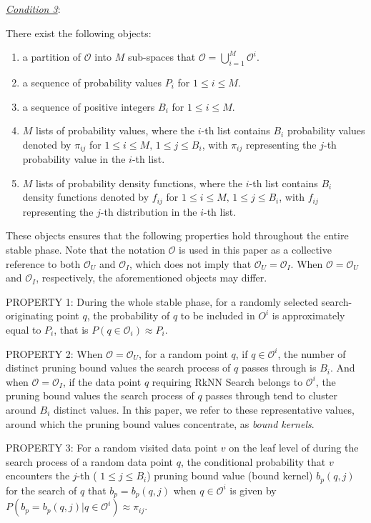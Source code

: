 \noindent \underline{\textit{Condition 3}}:  

There exist the following objects:
\begin{enumerate}
    \item a partition of $\mathcal{O}$ into $M$ sub-spaces that $\mathcal{O} = \bigcup_{i=1}^{M}\mathcal{O}^i$.
    \item  a sequence of probability values $P_i$ for $1 \leq i \leq M$.
    \item  a sequence of positive integers $B_i$ for $1 \leq i \leq M$.
    \item  $M$ lists of probability values, where the $i$-th list contains $B_i$ probability values denoted by $\pi_{ij}$ for $1 \leq i \leq M,\, 1 \leq j \leq B_i$, with $\pi_{ij}$ representing the $j$-th probability value in the $i$-th list.
    \item  $M$ lists of probability density functions, where the $i$-th list contains $B_i$ density functions denoted by $f_{ij}$ for $1 \leq i \leq M,\, 1 \leq j \leq B_i$, with $f_{ij}$ representing the $j$-th distribution in the $i$-th list.
\end{enumerate}
 These objects ensures that the following properties hold throughout the entire stable phase. Note that the notation $\mathcal{O}$ is used in this paper as a collective reference to both $\mathcal{O}_U$ and $\mathcal{O}_I$, which does not imply that $\mathcal{O}_U = \mathcal{O}_I$. When $\mathcal{O} = \mathcal{O}_U$ and $\mathcal{O}_I$, respectively, the aforementioned objects may differ.


\noindent PROPERTY 1: During the whole stable phase, for a randomly selected search-originating point $q$, the probability of $q$ to be included in $O^i$ is approximately equal to $P_i$, that is $P(q\in \mathcal{O}_i)\approx P_i$. 

\noindent PROPERTY 2: When $\mathcal{O}=\mathcal{O}_{U}$, for a random point $q$, if $q\in \mathcal{O}^i$, the number of distinct pruning bound values the search process of $q$ passes through is $B_i$. And when $\mathcal{O}=\mathcal{O}_{I}$, if the data point $q$ requiring RkNN Search belongs to $\mathcal{O}^i$, the pruning bound values the search process of $q$ passes through tend to cluster around $B_i$ distinct values. In this paper, we refer to these representative values, around which the pruning bound values concentrate, as \emph{bound kernels}.

\noindent PROPERTY 3: For a random visited data point $v$ on the leaf level of \dualtree  during the search process of a random data point $q$, the conditional probability that $v$ encounters the $j$-th ( $1\leq j\leq B_i$) pruning bound value (bound kernel) $b_{p}(q,j)$ for the search of $q$ that $b_p=b_{p}(q, j)$ when $q\in \mathcal{O}^i$ is given by $P(b_p=b_{p}(q, j)|q\in \mathcal{O}^i)\approx \pi_{ij}$. 

